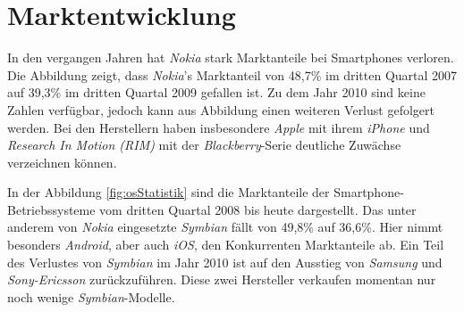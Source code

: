 \section{Marktentwicklung}

In den vergangen Jahren hat \emph{Nokia} stark Marktanteile bei Smartphones verloren. Die Abbildung zeigt, dass \emph{Nokia}'s Marktanteil von 48,7\% im dritten Quartal 2007 auf 39,3\% im dritten Quartal 2009 gefallen ist. Zu dem Jahr 2010 sind keine Zahlen verfügbar, jedoch kann aus Abbildung einen weiteren Verlust gefolgert werden. Bei den Herstellern haben insbesondere \emph{Apple} mit ihrem \emph{iPhone} und \emph{Research In Motion (RIM)} mit der \emph{Blackberry}-Serie deutliche Zuwächse verzeichnen können.

In der Abbildung \ref{fig:osStatistik} sind die Marktanteile der Smartphone-Betriebssysteme vom dritten Quartal 2008 bis heute dargestellt. Das unter anderem von \emph{Nokia} eingesetzte \emph{Symbian} fällt von 49,8\% auf 36,6\%. Hier nimmt besonders \emph{Android}, aber auch \emph{iOS}, den Konkurrenten Marktanteile ab. Ein Teil des Verlustes von \emph{Symbian} im Jahr 2010 ist auf den Ausstieg von \emph{Samsung} und \emph{Sony-Ericsson} zurückzuführen. Diese zwei Hersteller verkaufen momentan nur noch wenige \emph{Symbian}-Modelle.
